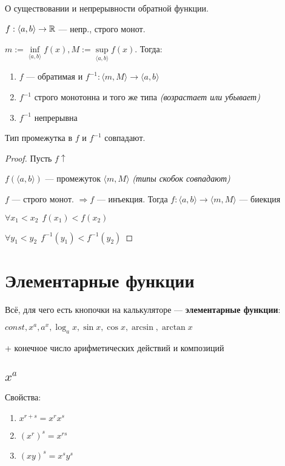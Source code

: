 \begin{theorem}
    О существовании и непрерывности обратной функции.

    $f:\langle a, b\rangle\to\operatorname*{\mathbb{R}}$ --- непр., строго монот.

    $m:=\inf\limits_{\langle a, b\rangle} f(x), M:=\sup\limits_{\langle a, b\rangle} f(x)$. Тогда:

    \begin{enumerate}
        \item $f$ --- обратимая и $f^{-1}:\langle m, M\rangle\to\langle a,b\rangle$
        \item $f^{-1}$ строго монотонна и того же типа \textit{(возрастает или убывает)}
        \item $f^{-1}$ непрерывна
    \end{enumerate}
\end{theorem}
\begin{remark}
    Тип промежутка в $f$ и $f^{-1}$ совпадают.
\end{remark}
\begin{proof}
    Пусть $f\uparrow$

    $f(\langle a,b\rangle)$ --- промежуток $\langle m, M\rangle$ \textit{(типы скобок совпадают)}

    $f$ --- строго монот. $\Rightarrow f$ --- инъекция. Тогда $f:\langle a,b\rangle\to\langle m,M\rangle$ --- биекция

    $\forall x_1<x_2 \ \ f(x_1)<f(x_2)$

    $\forall y_1<y_2 \ \ f^{-1}(y_1)<f^{-1}(y_2)$
\end{proof}

\section{Элементарные функции}

\begin{definition}
    Всё, для чего есть кнопочки на калькуляторе --- \textbf{элементарные функции}:

    $const, x^a, a^x, \log_a x, \sin x, \cos x, \arcsin, \arctan x$

    + конечное число арифметических действий и композиций
\end{definition}

\subsection{$x^a$}
Свойства:
\begin{enumerate}
    \item $x^{r+s}=x^rx^s$
    \item $(x^r)^s=x^{rs}$
    \item $(xy)^s=x^sy^s$
\end{enumerate}


